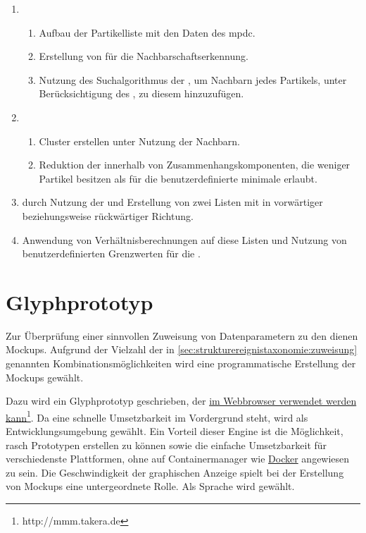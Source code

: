 \begin{enumerate}
	\item
	\begin{enumerate}
		\item Aufbau der Partikelliste mit den Daten des \gls{mpdc}.
		\item Erstellung von  für die Nachbarschaftserkennung.
		\item Nutzung des  Suchalgorithmus der \ANN, um Nachbarn jedes Partikels, unter Berücksichtigung des  , zu diesem hinzuzufügen.
	\end{enumerate}
	\item
	\begin{enumerate}
		\item Cluster erstellen unter Nutzung der Nachbarn.
		\item Reduktion der  innerhalb von Zusammenhangskomponenten, die weniger Partikel besitzen als für die benutzerdefinierte minimale  erlaubt.
	\end{enumerate}
	\item \SECC durch Nutzung der  und Erstellung von zwei Listen mit  in vorwärtiger beziehungsweise rückwärtiger Richtung.
	\item Anwendung von Verhältnisberechnungen auf diese Listen und Nutzung von benutzerdefinierten Grenzwerten für die .
\end{enumerate}

\section{Glyphprototyp}\label{sec:glyphprototyp}
Zur Überprüfung einer sinnvollen Zuweisung von Datenparametern zu den  dienen Mockups. Aufgrund der Vielzahl der in \autoref{sec:strukturereignistaxonomie:zuweisung} genannten Kombinationsmöglichkeiten wird eine programmatische Erstellung der Mockups gewählt.

Dazu wird ein Glyphprototyp geschrieben, der \href{http://mmm.takera.de}{im Webbrowser verwendet werden kann}\footnote{http://mmm.takera.de}. Da eine schnelle Umsetzbarkeit im Vordergrund steht, wird  als Entwicklungsumgebung gewählt. Ein Vorteil dieser Engine ist die Möglichkeit, rasch Prototypen erstellen zu können sowie die einfache Umsetzbarkeit für verschiedenste Plattformen, ohne auf Containermanager wie \href{https://www.docker.com/}{Docker} angewiesen zu sein.
Die Geschwindigkeit der graphischen Anzeige spielt bei der Erstellung von Mockups eine untergeordnete Rolle. Als Sprache wird  gewählt.

